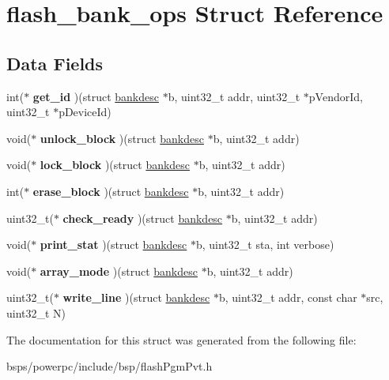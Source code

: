 \hypertarget{structflash__bank__ops}{}\section{flash\+\_\+bank\+\_\+ops Struct Reference}
\label{structflash__bank__ops}
\subsection*{Data Fields}
\begin{DoxyCompactItemize}
\item 
\mbox{\label{structflash__bank__ops_a9e1e6e0b66a9fff6d38461d4308fa5ce}} 
int($\ast$ {\bfseries get\+\_\+id} )(struct \mbox{\hyperlink{structbankdesc}{bankdesc}} $\ast$b, uint32\+\_\+t addr, uint32\+\_\+t $\ast$p\+Vendor\+Id, uint32\+\_\+t $\ast$p\+Device\+Id)
\item 
\mbox{\label{structflash__bank__ops_a1f02bf7c0c058f9c32b827b065a7bb18}} 
void($\ast$ {\bfseries unlock\+\_\+block} )(struct \mbox{\hyperlink{structbankdesc}{bankdesc}} $\ast$b, uint32\+\_\+t addr)
\item 
\mbox{\label{structflash__bank__ops_a18abc0701e50b6098e9817850f945c75}} 
void($\ast$ {\bfseries lock\+\_\+block} )(struct \mbox{\hyperlink{structbankdesc}{bankdesc}} $\ast$b, uint32\+\_\+t addr)
\item 
\mbox{\label{structflash__bank__ops_af613ab719c413bc270f32d4dd2fc177f}} 
int($\ast$ {\bfseries erase\+\_\+block} )(struct \mbox{\hyperlink{structbankdesc}{bankdesc}} $\ast$b, uint32\+\_\+t addr)
\item 
\mbox{\label{structflash__bank__ops_a8d0040bc3575b8e181376ce9cd1f016f}} 
uint32\+\_\+t($\ast$ {\bfseries check\+\_\+ready} )(struct \mbox{\hyperlink{structbankdesc}{bankdesc}} $\ast$b, uint32\+\_\+t addr)
\item 
\mbox{\label{structflash__bank__ops_aa6bde7751815b734484509f565653e10}} 
void($\ast$ {\bfseries print\+\_\+stat} )(struct \mbox{\hyperlink{structbankdesc}{bankdesc}} $\ast$b, uint32\+\_\+t sta, int verbose)
\item 
\mbox{\label{structflash__bank__ops_a875deb1be57b50adb7d81391afe5dbb2}} 
void($\ast$ {\bfseries array\+\_\+mode} )(struct \mbox{\hyperlink{structbankdesc}{bankdesc}} $\ast$b, uint32\+\_\+t addr)
\item 
\mbox{\label{structflash__bank__ops_a8da5136f6ce8155463a331fca39d68ce}} 
uint32\+\_\+t($\ast$ {\bfseries write\+\_\+line} )(struct \mbox{\hyperlink{structbankdesc}{bankdesc}} $\ast$b, uint32\+\_\+t addr, const char $\ast$src, uint32\+\_\+t N)
\end{DoxyCompactItemize}


The documentation for this struct was generated from the following file\+:\begin{DoxyCompactItemize}
\item 
bsps/powerpc/include/bsp/flash\+Pgm\+Pvt.\+h\end{DoxyCompactItemize}
